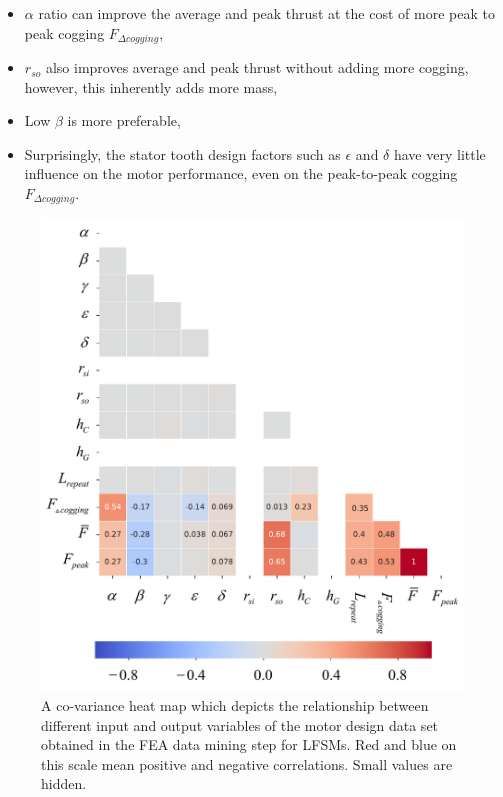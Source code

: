             
            \begin{itemize}
                \item $\alpha$ ratio can improve the average and peak thrust at the cost of more peak to peak cogging $F_{\Delta cogging}$,
                \item $r_{so}$ also improves average and peak thrust without adding more cogging, however, this inherently adds more mass,
                \item Low $\beta$ is more preferable,
                \item Surprisingly, the stator tooth design factors such as $\epsilon$ and $\delta$ have very little influence on the motor performance, even on the peak-to-peak cogging $F_{\Delta cogging}$.
            \end{itemize}
            
            
            \begin{figure}
                \centering
                \includegraphics[width=5in, trim=0 0 0 129mm, clip]{chap4/images2/heatmap.pdf}
                \caption{A co-variance heat map which depicts the relationship between different input and output variables of the motor design data set obtained in the \acs{FEA} data mining step for \acsp{LFSM}. Red and blue on this scale mean positive and negative correlations. Small values are hidden.}
                \label{fig:chap/rsm/LFSM/data mining/heat map}
            \end{figure}
        
